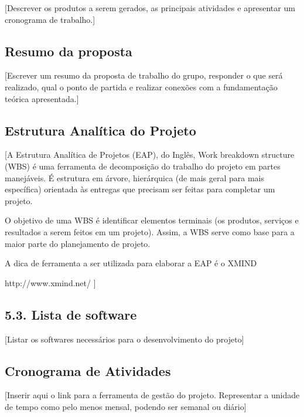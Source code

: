
[Descrever os produtos a serem gerados, as principais atividades e apresentar um cronograma de trabalho.]

\subsection{Resumo da proposta}
	
	[Escrever um resumo da proposta de trabalho do grupo, responder o que será realizado, qual o ponto de partida e realizar conexões com a fundamentação teórica apresentada.]

\subsection{Estrutura Analítica do Projeto}
	
	[A Estrutura Analítica de Projetos (EAP), do Inglês, Work breakdown structure (WBS) é uma ferramenta de decomposição do trabalho do projeto em partes manejáveis. É estrutura em árvore, hierárquica (de mais geral para mais específica) orientada às entregas que precisam ser feitas para completar um projeto.

	O objetivo de uma WBS é identificar elementos terminais (os produtos, serviços e resultados a serem feitos em um projeto). Assim, a WBS serve como base para a maior parte do planejamento de projeto.
	
	A dica de ferramenta a ser utilizada para elaborar a EAP é o XMIND 
	
	http://www.xmind.net/ ]

\subsection{5.3. Lista de software}
	
	[Listar os softwares necessários para o desenvolvimento do projeto]

\subsection{Cronograma de Atividades}

	[Inserir aqui o link para a ferramenta de gestão do projeto. Representar a unidade de tempo como pelo menos mensal, podendo ser semanal ou diário]

